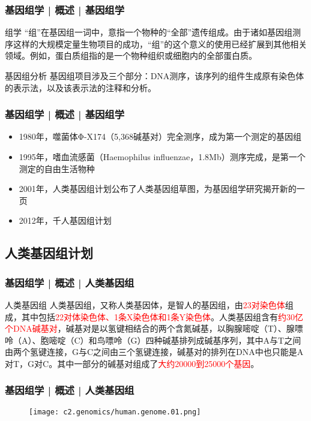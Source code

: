 \begin{frame}
  \frametitle{基因组学 | 概述 | 基因组学}
  \begin{block}{组学}
“组”在基因组一词中，意指一个物种的“全部”遗传组成。由于诸如基因组测序这样的大规模定量生物项目的成功，“组”的这个意义的使用已经扩展到其他相关领域。例如，蛋白质组指的是一个物种组织或细胞内的全部蛋白质。 
  \end{block}
  \pause
  \begin{block}{基因组分析}
基因组项目涉及三个部分：DNA测序，该序列的组件生成原有染色体的表示法，以及该表示法的注释和分析。
  \end{block}
\end{frame}

\begin{frame}
  \frametitle{基因组学 | 概述 | 基因组学}
  \begin{itemize}[<+->]
    \item 1980年，噬菌体Φ-X174（5,368碱基对）完全测序，成为第一个测定的基因组
    \item 1995年，嗜血流感菌（Haemophilus influenzae，1.8Mb）测序完成，是第一个测定的自由生活物种
    \item 2001年，人类基因组计划公布了人类基因组草图，为基因组学研究揭开新的一页
    \item 2012年，千人基因组计划
  \end{itemize}
\end{frame}

\subsection{人类基因组计划}
\begin{frame}
  \frametitle{基因组学 | 概述 | 人类基因组}
  \begin{block}{人类基因组}
人类基因组，又称人类基因体，是智人的基因组，由\textcolor{red}{23对染色体}组成，其中包括\textcolor{red}{22对体染色体、1条X染色体和1条Y染色体}。人类基因组含有\textcolor{red}{约30亿个DNA碱基对}，碱基对是以氢键相结合的两个含氮碱基，以胸腺嘧啶（T）、腺嘌呤（A）、胞嘧啶（C）和鸟嘌呤（G）四种碱基排列成碱基序列，其中A与T之间由两个氢键连接，G与C之间由三个氢键连接，碱基对的排列在DNA中也只能是A对T，G对C。其中一部分的碱基对组成了\textcolor{red}{大约20000到25000个基因}。 
  \end{block}
\end{frame}

\begin{frame}
  \frametitle{基因组学 | 概述 | 人类基因组}
  \begin{figure}
    \centering
    \texttt{[image: c2.genomics/human.genome.01.png]}
  \end{figure}
\end{frame}

